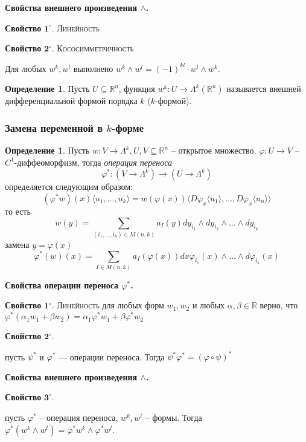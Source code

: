 \documentclass[a5paper]{article}
\newcounter{through}
\theoremstyle{plain}
\theoremstyle{definition}
\newtheorem{definition}[through]{Определение}
\numberwithin{through}{section}
\numberwithin{equation}{section}
\begin{document}
{\bf Свойства внешнего произведения $\wedge$.}

\medskip
{\bf Свойство} $\mathbf{1^\circ.}$
{\textsc{Линейность}}

\medskip
{\bf Свойство} $\mathbf{2^\circ.}$
{\textsc{Кососимметричность}}

Для любых $w^k, w^l$ выполнено $w^k \wedge w^l = 
(-1)^{kl} \cdot w^l \wedge w^k$.

\begin{definition}
	Пусть $U \subseteq \mathbb{R}^n$, функция
	$w^k: U \to \Lambda^k(\mathbb{R}^n)$ называется внешней дифференциальной формой порядка $k$ ($k$-формой).
\end{definition}

\subsubsection{Замена переменной в $k$-форме}
\begin{definition}
	Пусть $w: V \to \Lambda^k, U, V \subseteq \mathbb{R}^n$ -- открытое множество, 
	$\varphi: U \to V$ -- $C^1$-диффеоморфизм, тогда \textit{операция переноса} 
	\[ \varphi^*: (V \to \Lambda^k) \to (U \to \Lambda^k) \]
	определяется следующим образом:
	\[ (\varphi^*w)(x)\langle u_1,\ldots,u_k\rangle = w(\varphi(x))\langle D\varphi_x \langle u_1 \rangle,
	\ldots, D\varphi_x\langle u_n \rangle \rangle  \]
	то есть 
	\[ w(y) = \sum\limits_{ (i_1,\ldots,i_k) \in M(n,k) } a_I(y) dy_{i_1}\wedge dy_{i_2} \wedge \ldots \wedge dy_{i_k} \]
	замена $y = \varphi(x)$
	\[ \varphi^*(w)(x) = \sum\limits_{I \in M(n,k)} a_I(\varphi(x)) dx\varphi_{i_1}(x) \wedge\ldots\wedge d\varphi_{i_k}(x) \]
\end{definition}

{\bf Свойства операции переноса $\varphi^*$.}

\medskip
{\bf Свойство} $\mathbf{1^\circ.}$
{\textsc{Линейность}}
для любых форм $w_1, w_2$ и любых $\alpha, \beta \in \mathbb{R}$ верно, что
$\varphi^*(\alpha_1w_1 + \beta w_2) = \alpha_1\varphi^*w_1 + \beta \varphi^* w_2$

\medskip
{\bf Свойство} $\mathbf{2^\circ.}$

пусть $\psi^*$ и $\varphi^*$ --- операции переноса. Тогда
$\psi^*\varphi^* = (\varphi \circ \psi)^*$

{\bf Свойства внешнего произведения $\wedge$.}

\medskip
{\bf Свойство} $\mathbf{3^\circ.}$

пусть $\varphi^*$ -- операция переноса, $w^k, w^l$ -- формы. Тогда
$\varphi^* (w^k \wedge w^l) = \varphi^* w^k \wedge \varphi^* w^l$.
\end{document}
